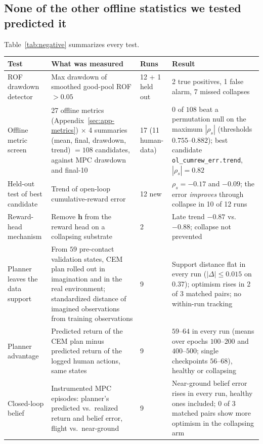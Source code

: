 \documentclass[11pt]{article}
\theoremstyle{remark}
\begin{document}
\subsection{None of the other offline statistics we tested predicted it}
\label{sec:negative-tests}

Table~\ref{tab:negative} summarizes every test.

\begin{table}[htbp]
\centering
\footnotesize
\setlength{\tabcolsep}{4pt}
\renewcommand{\arraystretch}{1.15}
\begin{tabular}{@{}p{3.5cm} p{5.1cm} p{1.7cm} p{5.3cm}@{}}
\toprule
\textbf{Test} & \textbf{What was measured} & \textbf{Runs} & \textbf{Result} \\
\midrule
ROF drawdown detector & Max drawdown of smoothed good-pool ROF $> 0.05$ & 12 + 1 held out & 2 true positives, 1 false alarm, 7 missed collapses \\
Offline metric screen & 27 offline metrics (Appendix~\ref{sec:app-metrics}) $\times$ 4 summaries (mean, final, drawdown, trend) $=108$ candidates, against MPC drawdown and final-10 & 17 (11 human-data) & $0$ of $108$ beat a permutation null on the maximum $|\rho_s|$ (thresholds $0.755$--$0.882$); best candidate \texttt{ol\_cumrew\_err.trend}, $|\rho_s|{=}0.82$ \\
Held-out test of best candidate & Trend of open-loop cumulative-reward error & 12 new & $\rho_s{=}-0.17$ and $-0.09$; the error \emph{improves} through collapse in 10 of 12 runs \\
Reward-head mechanism & Remove $\bm{h}$ from the reward head on a collapsing substrate & 2 & Late trend $-0.87$ vs.\ $-0.88$; collapse not prevented \\
Planner leaves the data support & From $59$ pre-contact validation states, CEM plan rolled out in imagination and in the real environment; standardized distance of imagined observations from training observations & 9 & Support distance flat in every run ($|\Delta| \le 0.015$ on $0.37$); optimism rises in 2 of 3 matched pairs; no within-run tracking \\
Planner advantage & Predicted return of the CEM plan minus predicted return of the logged human actions, same states & 9 & $59$--$64$ in every run (means over epochs $100$--$200$ and $400$--$500$; single checkpoints $56$--$68$), healthy or collapsing \\
Closed-loop belief & Instrumented MPC episodes: planner's predicted vs.\ realized return and belief error, flight vs.\ near-ground & 9 & Near-ground belief error rises in every run, healthy ones included; 0 of 3 matched pairs show more optimism in the collapsing arm \\

\end{tabular}
\end{table}
\end{document}
